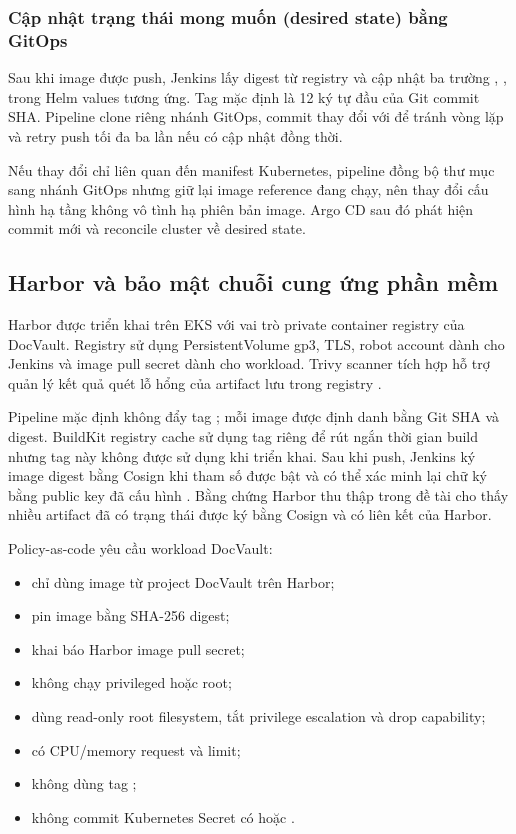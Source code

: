 \subsubsection{Cập nhật trạng thái mong muốn (desired state) bằng GitOps}

Sau khi image được push, Jenkins lấy digest từ registry và cập nhật ba trường , ,  trong Helm values tương ứng. Tag mặc định là 12 ký tự đầu của Git commit SHA. Pipeline clone riêng nhánh GitOps, commit thay đổi với \code{[skip ci]} để tránh vòng lặp và retry push tối đa ba lần nếu có cập nhật đồng thời.

Nếu thay đổi chỉ liên quan đến manifest Kubernetes, pipeline đồng bộ thư mục  sang nhánh GitOps nhưng giữ lại image reference đang chạy, nên thay đổi cấu hình hạ tầng không vô tình hạ phiên bản image. Argo CD sau đó phát hiện commit mới và reconcile cluster về desired state.

\subsection{Harbor và bảo mật chuỗi cung ứng phần mềm}

Harbor được triển khai trên EKS với vai trò private container registry của DocVault. Registry sử dụng PersistentVolume gp3, TLS, robot account dành cho Jenkins và image pull secret dành cho workload. Trivy scanner tích hợp hỗ trợ quản lý kết quả quét lỗ hổng của artifact lưu trong registry \cite{harbor_docs}.

Pipeline mặc định không đẩy tag ; mỗi image được định danh bằng Git SHA và digest. BuildKit registry cache sử dụng tag riêng  để rút ngắn thời gian build nhưng tag này không được sử dụng khi triển khai. Sau khi push, Jenkins ký image digest bằng Cosign khi tham số  được bật và có thể xác minh lại chữ ký bằng public key đã cấu hình \cite{sigstore_cosign}. Bằng chứng Harbor thu thập trong đề tài cho thấy nhiều artifact đã có trạng thái được ký bằng Cosign và có liên kết  của Harbor.

Policy-as-code yêu cầu workload DocVault:

\begin{itemize}
  \item chỉ dùng image từ project DocVault trên Harbor;
  \item pin image bằng SHA-256 digest;
  \item khai báo Harbor image pull secret;
  \item không chạy privileged hoặc root;
  \item dùng read-only root filesystem, tắt privilege escalation và drop capability;
  \item có CPU/memory request và limit;
  \item không dùng tag ;
  \item không commit Kubernetes Secret có  hoặc .
\end{itemize}

